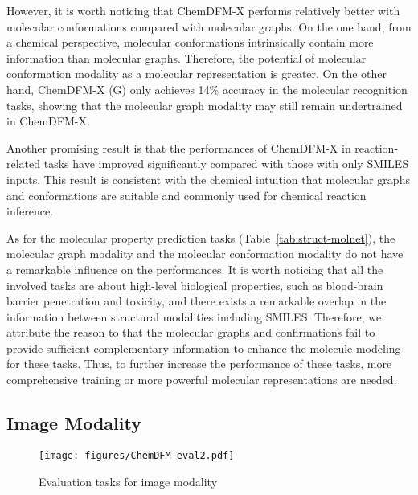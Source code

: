 However, it is worth noticing that ChemDFM-X performs relatively better with molecular conformations compared with molecular graphs. On the one hand, from a chemical perspective, molecular conformations intrinsically contain more information than molecular graphs. Therefore, the potential of molecular conformation modality as a molecular representation is greater. On the other hand, ChemDFM-X (G) only achieves 14\% accuracy in the molecular recognition tasks, showing that the molecular graph modality may still remain undertrained in ChemDFM-X.

Another promising result is that the performances of ChemDFM-X in reaction-related tasks have improved significantly compared with those with only SMILES inputs. This result is consistent with the chemical intuition that molecular graphs and conformations are suitable and commonly used for chemical reaction inference. %

As for the molecular property prediction tasks (Table~\ref{tab:struct-molnet}), the molecular graph modality and the molecular conformation modality do not have a remarkable influence on the performances.
It is worth noticing that all the involved tasks are about high-level biological properties, such as blood-brain barrier penetration and toxicity, and there exists a remarkable overlap in the information between structural modalities including SMILES. Therefore, we attribute the reason to that the molecular graphs and confirmations fail to provide sufficient complementary information to enhance the molecule modeling for these tasks. Thus, to further increase the performance of these tasks, more comprehensive training or more powerful molecular representations are needed.

\subsection{Image Modality}

\begin{figure}
    \centering
    \texttt{[image: figures/ChemDFM-eval2.pdf]}
    \caption{Evaluation tasks for image modality}
    \label{figure:eval2}
\end{figure}

